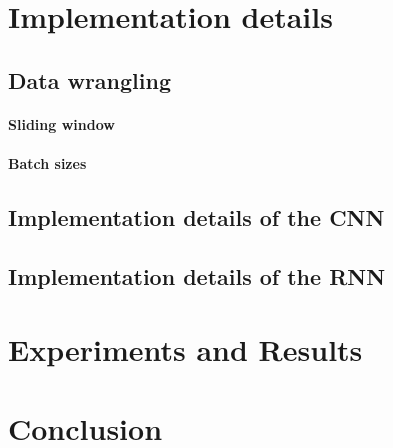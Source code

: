 \documentclass{utue} %
\begin{document}
\section{Implementation details}
\subsection{Data wrangling}
\paragraph{Sliding window}
\paragraph{Batch sizes}
\subsection{Implementation details of the CNN}

\subsection{Implementation details of the RNN}

\section{Experiments and Results}

\section{Conclusion}




\end{document}

